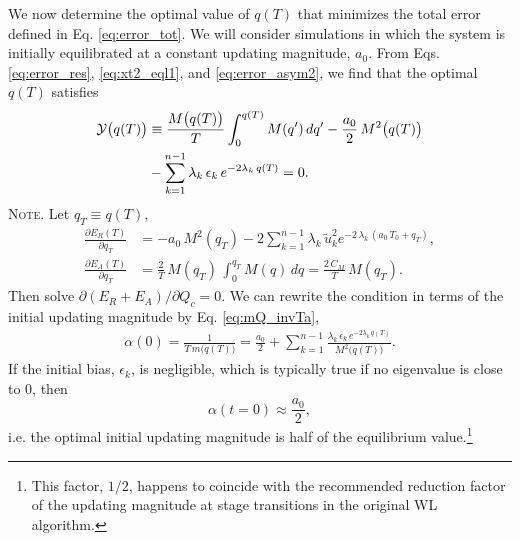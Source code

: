 \documentclass[reprint, superscriptaddress, floatfix]{revtex4-1}
\newcommand{\note}[1]{{\color{DarkGreen}\footnotesize \textsc{Note.} #1}}
\newcommand{\Err}{E}
\begin{document}
We now determine the optimal value of $q(T)$
that minimizes the total error defined in Eq. \eqref{eq:error_tot}.
%
We will consider simulations in which
the system is initially equilibrated at a
constant updating magnitude, $a_0$.
%
From Eqs. \eqref{eq:error_res}, \eqref{eq:xt2_eql1},
and \eqref{eq:error_asym2},
we find that
the optimal $q(T)$ satisfies
%
\begin{align}
  \mathcal Y\bigl( q(T) \bigr)
  &\equiv
  \frac{ M\bigl( q(T) \bigr) } { T }
    \int_0^{q(T)} M(q') \, d q'
  -\frac{a_0}{2} \, M^2\bigl( q(T) \bigr)
  \notag \\
  &
  -\sum_{k = 1}^{n-1}
  \lambda_k \, \epsilon_k \, e^{-2\lambda_k \, q(T)}
  =0
  .
\label{eq:opt_qT}
\end{align}
%
%
\note{Let $q_T \equiv q(T)$,
$$
\begin{aligned}
  \frac{
    \partial \Err_R(T)
  }
  {
    \partial q_T
  }
  &=
  -a_0 \, M^2(q_T)
  -2
  \sum_{k=1}^{n-1} \lambda_k \,
  \tilde u_k^2 e^{-2 \, \lambda_k \, (a_0 \, T_0 + q_T)}
  ,
  \\
  \frac{
    \partial \Err_A(T)
  }
  {
    \partial q_T
  }
  &=
  \frac 2 T \,
  M(q_T) \,
  \int_0^{ q_T } M(q) \, dq
  =
  \frac{ 2 \, C_M } { T } \, M(q_T)
  .
\end{aligned}
$$
Then solve $\partial (\Err_R + \Err_A) / \partial Q_c = 0$.
}
%
We can rewrite the condition in terms of
the initial updating magnitude by Eq. \eqref{eq:mQ_invTa},
\begin{align}
  \alpha(0)
  =
  \frac{1}{T \, m\bigl( q(T) \bigr) }
  =
  \frac{ a_0 } { 2 }
  +
  \sum_{k = 1}^{n-1}
  \frac{
    \lambda_k \, \epsilon_k \, e^{-2\lambda_k \, q(T)}
  }{M^2\bigl( q(T) \bigr)}
  .
  \label{eq:opt_alpha0}
\end{align}
%
If the initial bias, $\epsilon_k$, is negligible,
which is typically true if no eigenvalue is close to $0$,
then
%
\begin{equation}
  \alpha( t = 0 )
  \approx
  \frac{ a_0 }
       { 2 }
  ,
\label{eq:half_alpha0}
\end{equation}
%
i.e. the optimal initial updating magnitude
is half of the equilibrium value.\footnote{This factor, $1/2$,
happens to coincide with the
recommended reduction factor of the updating magnitude
at stage transitions
in the original WL algorithm\cite{
wang2001, wang2001pre}.
}
\end{document}
